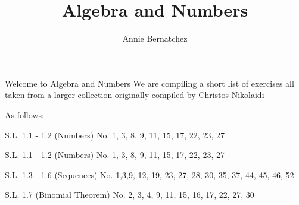 \documentclass{article}
\title{Algebra and Numbers}
\author{Annie Bernatchez}
\begin{document}
  \maketitle
  \newpage

  Welcome to Algebra and Numbers
  \newpage
  We are compiling a short list of exercises all taken   from a larger collection originally compiled by Christos Nikolaidi
  
  As follows:

     S.L. 1.1 - 1.2 (Numbers)
     No. 1, 3, 8, 9, 11, 15, 17, 22, 23, 27


     S.L. 1.1 - 1.2 (Numbers)
     No. 1, 3, 8, 9, 11, 15, 17, 22, 23, 27

     S.L. 1.3 - 1.6 (Sequences)
     No. 1,3,9, 12, 19, 23, 27, 
     28, 30, 35, 37, 44, 45, 46, 52

     S.L. 1.7 (Binomial Theorem)
     No.  2, 3, 4, 9, 11, 15, 16, 17, 22, 27, 30 


  
  
\end{document}
